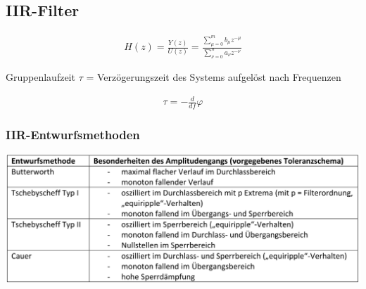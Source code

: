 \documentclass[10pt,a4paper]{article}
\begin{document}
\subsection{IIR-Filter}
  \begin{mdframed}[style=exercise]
    \begin{align}
        H(z)=\frac{Y(z)}{U(z)}= \frac{\sum_{\mu=0}^{m} b_\mu z^{-\mu}}{\sum_{\nu=0}^{n} a_\nu z^{-\nu}}
    \end{align}
  \end{mdframed}
Gruppenlaufzeit $\tau$ = Verzögerungszeit des Systems aufgelöst nach Frequenzen
  \begin{mdframed}[style=exercise]
    \begin{align}
        \tau = -\frac{d}{df}\varphi
    \end{align}
  \end{mdframed}
\subsubsection{IIR-Entwurfsmethoden}
  \begin{center}
      \includegraphics[width=.45\textwidth]{./img/entwurf.png}
  \end{center}
\end{document}
